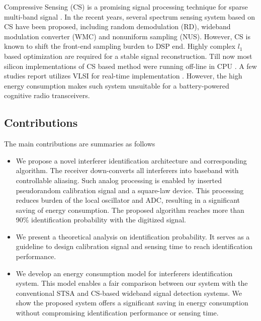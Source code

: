 \documentclass{IEEEtran}
\begin{document}
Compressive Sensing (CS) is a promising signal processing technique for sparse multi-band signal \cite{4472240}. In the recent years, several spectrum sensing system based on CS have been proposed, including random demodulation (RD), wideband modulation converter (WMC) and nonuniform sampling (NUS). However, CS is known to shift the front-end sampling burden to DSP end. Highly complex $l_1$ based optimization are required for a stable signal reconstruction. Till now most silicon implementations of CS based method were running off-line in CPU \cite{6502272,5678599}. A few studies report utilizes VLSI for real-time implementation \cite{6637036}. However, the high energy consumption makes such system unsuitable for a battery-powered cognitive radio transceivers.


\subsection{Contributions}
The main contributions are summaries as follows

\begin{itemize}
\item 
We propose a novel interferer identification architecture and corresponding algorithm. The receiver down-converts all interferers into baseband with controllable aliasing. Such analog processing is enabled by inserted pseudorandom calibration signal and a square-law device. This processing reduces burden of the local oscillator and ADC, resulting in a significant saving of energy consumption. The proposed algorithm reaches more than 90\% identification probability with the digitized signal. 

\item We present a theoretical analysis on identification probability. It serves as a guideline to design calibration signal and sensing time to reach identification performance.

\item We develop an energy consumption model for interferers identification system. This model enables a fair comparison between our system with the conventional STSA and CS-based wideband signal detection systems. We show the proposed system offers a significant saving in energy consumption without compromising identification performance or sensing time. 
\end{itemize}

\end{document}
